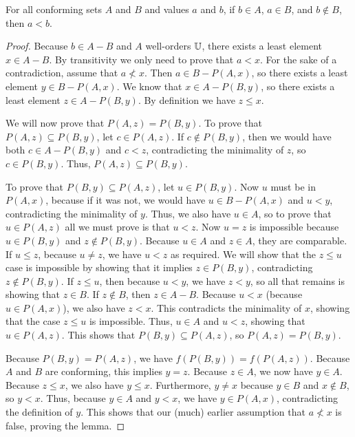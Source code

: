 \documentclass[../math.tex]{subfiles}
\begin{document}
\begin{lemma} \label{zorn_initial1}
    For all conforming sets $A$ and $B$ and values $a$ and $b$, if $b \in A$, $a
    \in B$, and $b \notin B$, then $a < b$.
\end{lemma}
\begin{proof}
    Because $b \in A - B$ and $A$ well-orders $\mathbb{U}$, there exists a least element
    $x \in A - B$.  By transitivity we only need to prove that $a < x$.  For the
    sake of a contradiction, assume that $a \nless x$.  Then $a \in B - P(A,
    x)$, so there exists a least element $y \in B - P(A, x)$.  We know that $x
    \in A - P(B, y)$, so there exists a least element $z \in A - P(B, y)$.  By
    definition we have $z \leq x$.

    We will now prove that $P(A, z) = P(B, y)$.  To prove that $P(A, z)
    \subseteq P(B, y)$, let $c \in P(A, z)$.  If $c \notin P(B, y)$, then we
    would have both $c \in A - P(B, y)$ and $c < z$, contradicting the
    minimality of $z$, so $c \in P(B, y)$.  Thus, $P(A, z) \subseteq P(B, y)$.

    To prove that $P(B, y) \subseteq P(A, z)$, let $u \in P(B, y)$.  Now $u$
    must be in $P(A, x)$, because if it was not, we would have $u \in B - P(A,
    x)$ and $u < y$, contradicting the minimality of $y$.  Thus, we also have $u
    \in A$, so to prove that $u \in P(A, z)$ all we must prove is that $u < z$.
    Now $u = z$ is impossible because $u \in P(B, y)$ and $z \notin P(B, y)$.
    Because $u \in A$ and $z \in A$, they are comparable.  If $u \leq z$,
    because $u \neq z$, we have $u < z$ as required.  We will show that the $z
    \leq u$ case is impossible by showing that it implies $z \in P(B, y)$,
    contradicting $z \notin P(B, y)$.  If $z \leq u$, then because $u < y$, we
    have $z < y$, so all that remains is showing that $z \in B$.  If $z \notin
    B$, then $z \in A - B$.  Because $u < x$ (because $u \in P(A, x)$), we also
    have $z < x$.  This contradicts the minimality of $x$, showing that the case
    $z \leq u$ is impossible.  Thus, $u \in A$ and $u < z$, showing that $u \in
    P(A, z)$.  This shows that $P(B, y) \subseteq P(A, z)$, so $P(A, z) = P(B,
    y)$.

    Because $P(B, y) = P(A, z)$, we have $f(P(B, y)) = f(P(A, z))$.  Because $A$
    and $B$ are conforming, this implies $y = z$.  Because $z \in A$, we now
    have $y \in A$.  Because $z \leq x$, we also have $y \leq x$.  Furthermore,
    $y \neq x$ because $y \in B$ and $x \notin B$, so $y < x$.  Thus, because $y
    \in A$ and $y < x$, we have $y \in P(A, x)$, contradicting the definition of
    $y$.  This shows that our (much) earlier assumption that $a \nless x$ is
    false, proving the lemma.
\end{proof}
\end{document}
